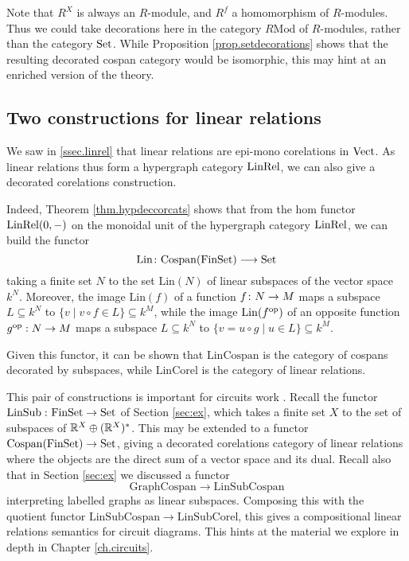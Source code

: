 Note that $R^X$ is always an $R$-module, and $R^f$ a homomorphism of
$R$-modules. Thus we could take decorations here in the category $R\mathrm{Mod}$
of $R$-modules, rather than the category $\mathrm{Set}$. While Proposition
\ref{prop.setdecorations} shows that the resulting decorated cospan category
would be isomorphic, this may hint at an enriched version of the theory.

\subsection{Two constructions for linear relations}

We saw in \textsection\ref{ssec.linrel} that linear relations are epi-mono
corelations in $\mathrm{Vect}$. As linear relations thus form a hypergraph category
$\mathrm{LinRel}$, we can also give a decorated corelations construction. 

Indeed, Theorem \ref{thm.hypdeccorcats} shows that from the hom functor
$\mathrm{LinRel}(0,-)$ on the monoidal unit of the hypergraph category $\mathrm{LinRel}$, we can
build the functor
\[
  \mathrm{Lin} {\colon}\mathrm{Cospan}(\mathrm{FinSet}) \longrightarrow \mathrm{Set}
\]
taking a finite set $N$ to the set $\mathrm{Lin}(N)$ of linear subspaces of the
vector space $k^N$. Moreover, the image $\mathrm{Lin}(f)$ of a function $f{\colon}
N \to M$ maps a subspace $L \subseteq k^N$ to $\{v \mid v\circ f \in L\}
\subseteq k^M$, while the image $\mathrm{Lin}(f^{\mathrm{op}})$ of an opposite function
$g^{\mathrm{op}}: N \to M$ maps a subspace $L \subseteq k^N$ to $\{v = u \circ g \mid u
\in L\} \subseteq k^M$. 

Given this functor, it can be shown that $\mathrm{LinCospan}$ is the category of
cospans decorated by subspaces, while $\mathrm{LinCorel}$ is the category of
linear relations. 

This pair of constructions is important for circuits work \cite{BF,BSZ}. Recall
the functor $\operatorname{LinSub}{\colon} \mathrm{FinSet} \to \mathrm{Set}$ of Section \ref{sec:ex}, which takes
a finite set $X$ to the set of subspaces of ${\mathbb{R}}^X \oplus ({\mathbb{R}}^X)^*$.  This may be
extended to a functor $\operatorname{{Cospan}}(\mathrm{FinSet}) \to \mathrm{Set}$, giving a decorated
corelations category of linear relations where the objects are the direct sum of
a vector space and its dual. Recall also that in Section \ref{sec:ex} we
discussed a functor 
\[
  \mathrm{GraphCospan} \to \mathrm{LinSubCospan}
\]
interpreting labelled graphs as linear subspaces. Composing this with the
quotient functor $\mathrm{LinSubCospan} \to \mathrm{LinSubCorel}$, this gives a
compositional linear relations semantics for circuit diagrams. This hints at the
material we explore in depth in Chapter \ref{ch.circuits}.


